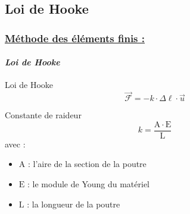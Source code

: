 \documentclass[10pt]{beamer}
\begin{document}
	\subsection{Loi de Hooke}
	\begin{frame}
		\frametitle{\uline{M\'ethode des \'el\'ements finis :}}
		\framesubtitle{\textit{Loi de Hooke}}
		\begin{block}{Loi de Hooke}
			\begin{equation}
  				\vec{\mathcal{F}} = - k \cdot \Delta \ell \cdot \vec{u}
  			\end{equation}
		\end{block}
		\begin{block}{Constante de raideur}
			\begin{equation}
				k = \frac{\mathrm{A} \cdot \mathrm{E}}{\mathrm{L}}
			\end{equation}
			avec :\\
  			\begin{itemize}
  				\item $\mathrm{A}$ : l'aire de la section de la poutre
  				\item $\mathrm{E}$ : le module de Young du matériel
  				\item $\mathrm{L}$ : la longueur de la poutre
  			\end{itemize}
		\end{block}
	\end{frame}
\end{document}
